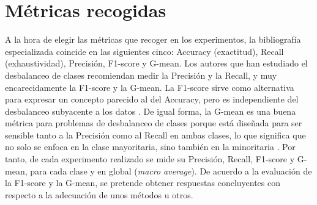 \section{Métricas recogidas\label{SEC:METRICS}}

A la hora de elegir las métricas que recoger en los experimentos, la bibliografía especializada coincide en las siguientes cinco: Accuracy (exactitud), Recall (exhaustividad), Precisión, F1-score y G-mean. Los autores que han estudiado el desbalanceo de clases \cite{johnson2019survey, dwivedi2019review, upadhyay2021state} recomiendan medir la Precisión y la Recall, y muy encarecidamente la F1-score y la G-mean. La F1-score sirve como alternativa para expresar un concepto parecido al del Accuracy, pero es independiente del desbalanceo subyacente a los datos \cite{johnson2019survey}. De igual forma, la G-mean es una buena métrica para problemas de desbalanceo de clases porque está diseñada para ser sensible tanto a la Precisión como al Recall en ambas clases, lo que significa que no solo se enfoca en la clase mayoritaria, sino también en la minoritaria \cite{upadhyay2021state}. Por tanto, de cada experimento realizado se mide su Precisión, Recall, F1-score y G-mean, para cada clase y en global (\textit{macro average}).
De acuerdo a la evaluación de la F1-score y la G-mean, se pretende obtener respuestas concluyentes con respecto a la adecuación de unos métodos u otros.

